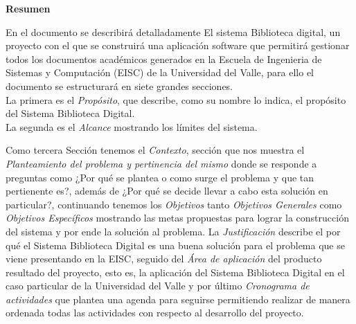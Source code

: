 %
%

\begin{center}
        \textbf{Resumen}
\end{center}

En el documento se describirá detalladamente El sistema Biblioteca digital, un proyecto con el que
se construirá una aplicación software que permitirá gestionar todos los documentos académicos
generados en la Escuela de Ingenieria de Sistemas y Computación (EISC) de la Universidad del Valle,
para ello el documento se estructurará en  siete grandes secciones. \\

La primera es el \textit{Propósito}, que describe, como su nombre lo indica, el propósito del
Sistema Biblioteca Digital.\\

La segunda es el \textit{Alcance} mostrando los límites del sistema.

Como tercera Sección tenemos el \textit{Contexto}, sección que nos muestra el \textit{Planteamiento
del problema y pertinencia del mismo} donde se responde a preguntas como ¿Por qué se plantea o como
surge el problema y que tan pertienente es?, además de ¿Por qué se decide llevar a cabo esta
solución en particular?, continuando tenemos los \textit{Objetivos} tanto \textit{Objetivos
Generales} como \textit{Objetivos Específicos} mostrando las metas propuestas para lograr la
construcción del sistema y por ende la solución al problema. La \textit{Justificación} describe el
por qué el Sistema Biblioteca Digital es una buena solución para el problema que se viene
presentando en la EISC, seguido del \textit{Área de aplicación} del producto resultado del
proyecto, esto es, la aplicación del Sistema Biblioteca Digital en el caso particular de la
Universidad del Valle y por último \textit{Cronograma de actividades} que plantea una agenda para
seguirse permitiendo realizar de manera ordenada todas las actividades con respecto al desarrollo
del proyecto.\\
 
